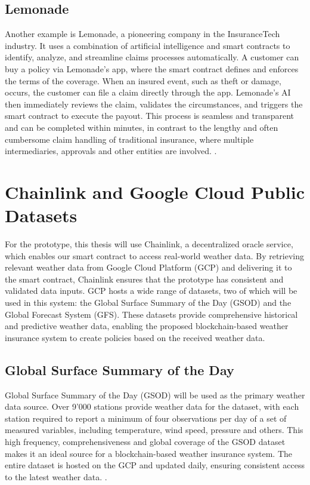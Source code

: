 \subsection{Lemonade}
Another example is Lemonade, a pioneering company in the InsuranceTech industry. It uses a combination of artificial intelligence and smart contracts to identify, analyze, and streamline claims processes automatically. A customer can buy a policy via Lemonade's app, where the smart contract defines and enforces the terms of the coverage. When an insured event, such as theft or damage, occurs, the customer can file a claim directly through the app. Lemonade's AI then immediately reviews the claim, validates the circumstances, and triggers the smart contract to execute the payout. This process is seamless and transparent and can be completed within minutes, in contrast to the lengthy and often cumbersome claim handling of traditional insurance, where multiple intermediaries, approvals and other entities are involved. \autocites{la2023insurtech}{tardieu2020case}.
 
\section{Chainlink and Google Cloud Public Datasets}\label{section:chainlink_google_cloud_datasets}
For the prototype, this thesis will use Chainlink, a decentralized oracle service, which enables our smart contract to access real-world weather data. By retrieving relevant weather data from Google Cloud Platform (GCP) and delivering it to the smart contract, Chainlink ensures that the prototype has consistent and validated data inputs. GCP hosts a wide range of datasets, two of which will be used in this system: the Global Surface Summary of the Day (GSOD) and the Global Forecast System (GFS). These datasets provide comprehensive historical and predictive weather data, enabling the proposed blockchain-based weather insurance system to create policies based on the received weather data.

\subsection{Global Surface Summary of the Day}
Global Surface Summary of the Day (GSOD) will be used as the primary weather data source. Over 9'000 stations provide weather data for the dataset, with each station required to report a minimum of four observations per day of a set of measured variables, including temperature, wind speed, pressure and others. This high frequency, comprehensiveness and global coverage of the GSOD dataset makes it an ideal source for a blockchain-based weather insurance system. The entire dataset is hosted on the GCP and updated daily, ensuring consistent access to the latest weather data. \autocite{NOAA_GSOD_2023}.

